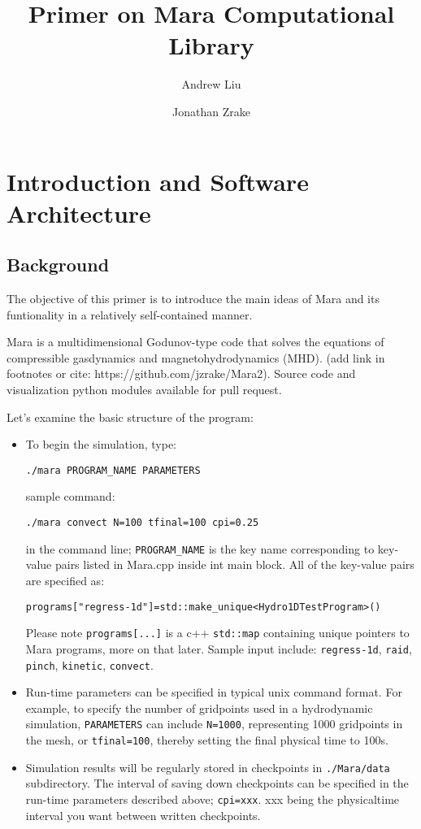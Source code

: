 \documentclass{article}
\title{Primer on Mara Computational Library}
\author{Andrew Liu \and Jonathan Zrake}
\begin{document}
\maketitle

\section{Introduction and Software Architecture}
\subsection{Background}
The objective of this primer is to introduce the main ideas of Mara and its funtionality in a relatively self-contained manner. 

Mara is a multidimensional Godunov-type code that solves the equations of
compressible gasdynamics and magnetohydrodynamics (MHD). (add link in footnotes or cite: https://github.com/jzrake/Mara2). Source code and visualization python modules available for pull request.

Let's examine the basic structure of the program:
\begin{itemize}
	\item To begin the simulation, type: 

	\texttt{./mara PROGRAM\_NAME PARAMETERS}

	sample command:

\texttt{./mara convect N=100 tfinal=100 cpi=0.25}
	
in the command line; \texttt{PROGRAM\_NAME} is the key name corresponding to key-value pairs listed in Mara.cpp inside int main block. All of the key-value pairs are specified as: 

\texttt{programs["regress-1d"]=std::make\_unique<Hydro1DTestProgram>()}

Please note \texttt{programs[...]} is a c++ \texttt{std::map} containing unique pointers to Mara programs, more on that later. Sample input include: \texttt{regress-1d}, \texttt{raid}, \texttt{pinch}, \texttt{kinetic}, \texttt{convect}.

	\item Run-time parameters can be specified in typical unix command format. For example, to specify the number of gridpoints used in a hydrodynamic simulation, \texttt{PARAMETERS} can include \texttt{N=1000}, representing 1000 gridpoints in the mesh, or \texttt{tfinal=100}, thereby setting the final physical time to 100s.  
	
	\item Simulation results will be regularly stored in checkpoints in \texttt{./Mara/data} subdirectory. The interval of saving down checkpoints can be specified in the run-time parameters described above; \texttt{cpi=xxx}. xxx being the physicaltime interval you want between written checkpoints.
	

\end{itemize}
\end{document}
